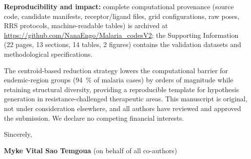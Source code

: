 \documentclass[9pt,letterpaper]{article}
\begin{document}
\noindent\textbf{Reproducibility and impact:} complete computational provenance (source code, candidate manifests, receptor/ligand files, grid configurations, raw poses, RRS protocols, machine-readable tables) is archived at \url{https://github.com/NanaEngo/Malaria_codesV2}; the Supporting Information (\num{22} pages, \num{13} sections, \num{14} tables, \num{2} figures) contains the validation datasets and methodological specifications.

The centroid-based reduction strategy lowers the computational barrier for endemic-region groups (\qty{94}{\percent} of malaria cases) by orders of magnitude while retaining structural diversity, providing a reproducible template for hypothesis generation in resistance-challenged therapeutic areas. This manuscript is original, not under consideration elsewhere, and all authors have reviewed and approved the submission. We declare no competing financial interests.

\vspace{0.3em}

\noindent Sincerely,

\noindent \textbf{Myke Vital Sao Temgoua} (on behalf of all co-authors)
\end{document}
